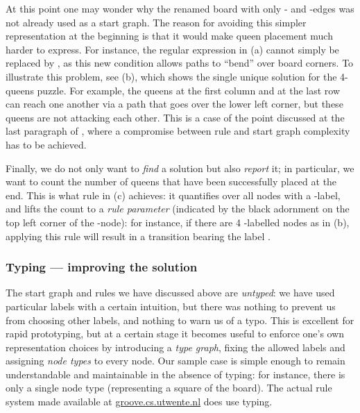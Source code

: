 
At this point one may wonder why the renamed board with only -
and -edges was not already used as a start graph. The reason  for
avoiding this simpler representation at the beginning is that it would make
queen placement much harder to express. For instance, the regular expression in
(a) cannot simply be replaced  by
, as this new condition allows paths to
``bend'' over board corners. To illustrate this problem, see
(b), which shows the single unique solution for the
4-queens puzzle. For example, the queens at the first column and at the last
row can reach one another via a  path that goes over the lower left
corner, but these queens are not attacking each other. This is a case of the
point discussed at the last paragraph of , where a compromise
between rule and start graph complexity has to be achieved.

Finally, we do not only want to \emph{find} a solution but also \emph{report}
it; in particular, we want to count the number of queens that have been
successfully placed at the end. This is what rule  in
(c) achieves: it quantifies over all nodes with a
-label, and lifts the count to a \emph{rule parameter} (indicated by
the black adornment on the top left corner of the -node):
for instance, if there are 4 -labelled nodes as in
(b), applying this rule will result in a transition
bearing the label .

\subsubsection{Typing --- improving the solution}

The start graph and rules we have discussed above are \emph{untyped}: we have
used particular labels with a certain intuition, but there was nothing to
prevent us from choosing other labels, and nothing to warn us of a typo. This is
excellent for rapid prototyping, but at a certain stage it becomes useful to
enforce one's own representation choices by introducing a \emph{type graph},
fixing the allowed labels and assigning \emph{node types} to every node. Our
sample case is simple enough to remain understandable and maintainable in the
absence of typing: for instance, there is only a single node type (representing
a square of the board). The actual rule system made available at
\url{groove.cs.utwente.nl} does use typing.

